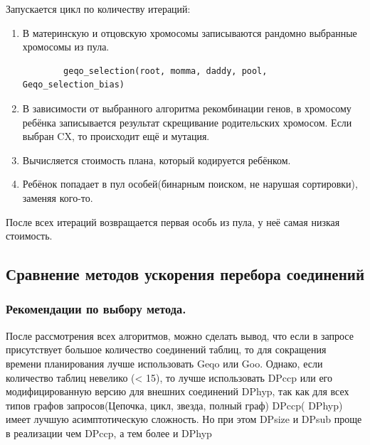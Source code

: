 \documentclass[12pt]{article}
\begin{document}
\begin{flushleft}
Запускается цикл по количеству итераций:
\begin{enumerate}
    \item В материнскую и отцовскую хромосомы записываются рандомно выбранные хромосомы из пула.
    \begin{lstlisting}
        geqo_selection(root, momma, daddy, pool, Geqo_selection_bias)
    \end{lstlisting}
    \item В зависимости от выбранного алгоритма рекомбинации генов, 
    в хромосому ребёнка записывается результат скрещивание 
    родительских хромосом. Если выбран CX, то происходит ещё и мутация.
    \item Вычисляется стоимость плана, который кодируется ребёнком.
    \item Ребёнок попадает в пул особей(бинарным поиском, не нарушая сортировки), заменяя кого-то.
\end{enumerate}
После всех итераций возвращается первая особь из пула, у неё самая низкая стоимость.

\centering \subsection*{Сравнение методов ускорения перебора соединений}
\centering \subsubsection*{Рекомендации по выбору метода.}
\raggedright
После рассмотрения всех алгоритмов, можно сделать вывод, что 
если в запросе присутствует большое количество соединений таблиц, то для сокращения 
времени планирования лучше использовать Geqo или Goo. Однако, если количество 
таблиц невелико (< 15), то лучше использовать DPccp или его модифицированную версию 
для внешних соединений DPhyp, так как для всех типов графов запросов(Цепочка, цикл, звезда, полный граф) 
DPccp( DPhyp) имеет лучшую асимптотическую сложность.
Но при этом DPsize и DPsub проще в реализации чем DPccp, а тем более и DPhyp


\end{flushleft}
\end{document}
